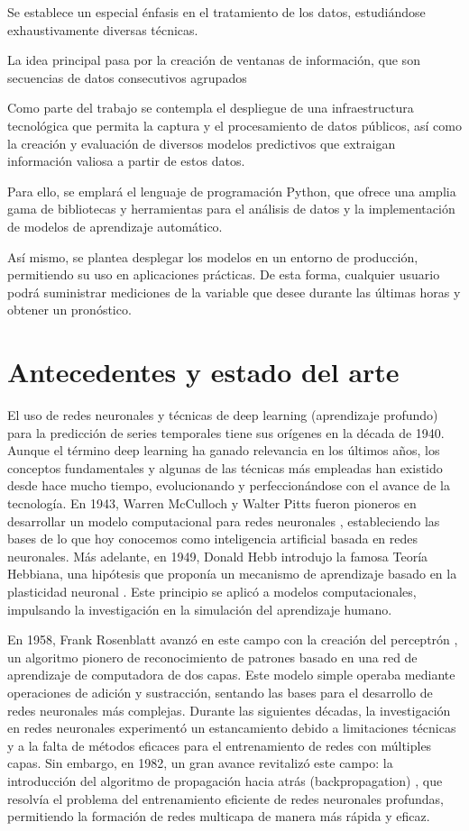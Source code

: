 Se establece un especial énfasis en el tratamiento de los datos, estudiándose exhaustivamente diversas técnicas.

La idea principal pasa por la creación de ventanas de información, que son secuencias de datos consecutivos agrupados 

Como parte del trabajo se contempla el despliegue de una infraestructura tecnológica que permita la captura y el procesamiento de datos públicos,
 así como la creación y evaluación de diversos modelos predictivos que extraigan información valiosa a partir de estos datos.
 
Para ello, se emplará el lenguaje de programación Python, que ofrece una amplia gama de bibliotecas y herramientas para el análisis de datos y la 
implementación de modelos de aprendizaje automático.

Así mismo, se plantea desplegar los modelos en un entorno de producción, permitiendo su uso en aplicaciones prácticas. 
De esta forma, cualquier usuario podrá suministrar mediciones de la variable que desee durante las últimas horas y obtener un pronóstico.

\section{Antecedentes y estado del arte}

El uso de redes neuronales y técnicas de deep learning (aprendizaje profundo) para la predicción de series temporales tiene sus orígenes en la década de 1940. Aunque el término deep learning ha ganado relevancia en los últimos años, los conceptos fundamentales y algunas de las técnicas más empleadas han existido desde hace mucho tiempo, evolucionando y perfeccionándose con el avance de la tecnología.
En 1943, Warren McCulloch y Walter Pitts fueron pioneros en desarrollar un modelo computacional para redes neuronales \cite{mcculloch1943}, 
estableciendo las bases de lo que hoy conocemos como inteligencia artificial basada en redes neuronales. 
Más adelante, en 1949, Donald Hebb introdujo la famosa Teoría Hebbiana, una hipótesis que proponía un mecanismo de aprendizaje basado en la plasticidad neuronal \cite{hebb1949}. 
Este principio se aplicó a modelos computacionales, impulsando la investigación en la simulación del aprendizaje humano.

En 1958, Frank Rosenblatt avanzó en este campo con la creación del perceptrón \cite{rosenblatt1958}, un algoritmo pionero de reconocimiento de patrones basado en una red de aprendizaje de computadora de dos capas.
Este modelo simple operaba mediante operaciones de adición y sustracción, sentando las bases para el desarrollo de redes neuronales más complejas.
Durante las siguientes décadas, la investigación en redes neuronales experimentó un estancamiento debido a limitaciones técnicas y a la falta de métodos eficaces para el entrenamiento de redes con múltiples capas. 
Sin embargo, en 1982, un gran avance revitalizó este campo: la introducción del algoritmo de propagación hacia atrás (backpropagation) \cite{werbos1982}, que resolvía el problema del entrenamiento eficiente de redes neuronales profundas, 
permitiendo la formación de redes multicapa de manera más rápida y eficaz.

